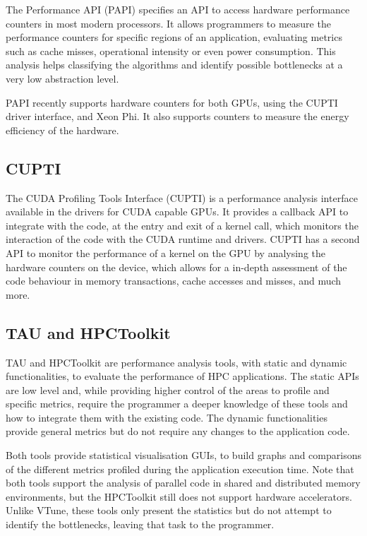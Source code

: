 The Performance API (PAPI) \cite{PAPI} specifies an API to access hardware performance counters in most modern processors. It allows programmers to measure the performance counters for specific regions of an application, evaluating metrics such as cache misses, operational intensity or even power consumption. This analysis helps classifying the algorithms and identify possible bottlenecks at a very low abstraction level.

PAPI recently supports hardware counters for both \nvidia GPUs, using the \nvidia CUPTI driver interface, and \intel Xeon Phi. It also supports counters to measure the energy efficiency of the hardware.

\subsection*{\nvidia CUPTI}

The \nvidia CUDA Profiling Tools Interface (CUPTI) \cite{NVIDIA:CUPTI} is a performance analysis interface available in the \nvidia drivers for CUDA capable GPUs. It provides a callback API to integrate with the code, at the entry and exit of a kernel call, which monitors the interaction of the code with the CUDA runtime and drivers. CUPTI has a second API to monitor the performance of a kernel on the GPU by analysing the hardware counters on the device, which allows for a in-depth assessment of the code behaviour in memory transactions, cache accesses and misses, and much more.

\subsection*{TAU and HPCToolkit}

TAU \cite{TAU} and HPCToolkit \cite{HPCToolkit} are performance analysis tools, with static and dynamic functionalities, to evaluate the performance of HPC applications. The static APIs are low level and, while providing higher control of the areas to profile and specific metrics, require the programmer a deeper knowledge of these tools and how to integrate them with the existing code. The dynamic functionalities provide general metrics but do not require any changes to the application code.

Both tools provide statistical visualisation GUIs, to build graphs and comparisons of the different metrics profiled during the application execution time. Note that both tools support the analysis of parallel code in shared and distributed memory environments, but the HPCToolkit still does not support hardware accelerators. Unlike VTune, these tools only present the statistics but do not attempt to identify the bottlenecks, leaving that task to the programmer.

